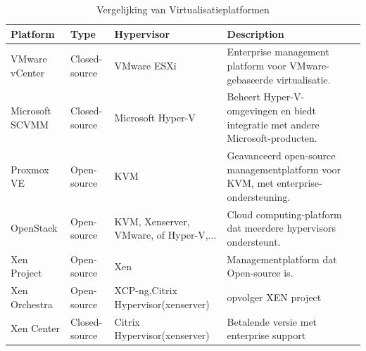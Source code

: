     \begin{table}[h!]
        \centering
        \small
        \begin{tabular}{|p{2cm}|p{2cm}|p{3cm}|p{7cm}|p{7cm}|}         
        \hline
        \textbf{Platform}      & \textbf{Type}      & \textbf{Hypervisor} & \textbf{Description} \\ \hline      
        VMware vCenter         & Closed-source      & VMware ESXi         & Enterprise management platform voor VMware-gebaseerde virtualisatie. \\ \hline
        Microsoft SCVMM        & Closed-source      & Microsoft Hyper-V   & Beheert Hyper-V-omgevingen en biedt integratie met andere Microsoft-producten. \\ \hline
        Proxmox VE             & Open-source        & KVM                 & Geavanceerd open-source managementplatform voor KVM, met enterprise-ondersteuning. \\ \hline
        OpenStack              & Open-source        & KVM, Xenserver, VMware, of Hyper-V,...  & Cloud computing-platform dat meerdere hypervisors ondersteunt. \\ \hline
        Xen Project            & Open-source        & Xen                 & Managementplatform dat Open-source is. \\ \hline
        Xen Orchestra  & Open-source & XCP-ng,Citrix Hypervisor(xenserver)  & opvolger XEN project \\ \hline
        Xen Center  & Closed-source & Citrix Hypervisor(xenserver)   &  Betalende versie met enterprise support\\ 
       \bottomrule        
        \end{tabular}
        \caption{Vergelijking van Virtualisatieplatformen}
        \label{tab:longlist}        
        \end{table}
\clearpage        
